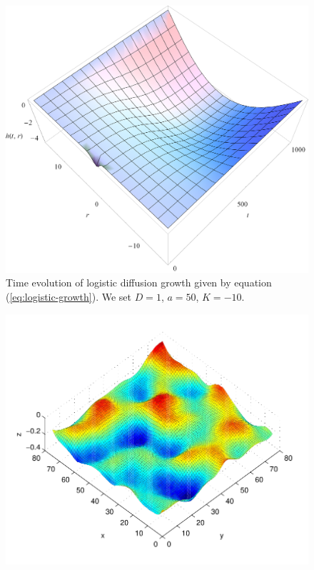 \documentclass[a0,portrait]{a0poster}
\begin{document}
\begin{multicols}{2}
  \begin{minipage}[b]{0.5\textwidth}
  \centering
      \begin{minipage}{0.43\linewidth}
          \begin{figure}[H]
              \includegraphics[width=\textwidth]{difuzija-logisticna-rast2.png}
              \caption{Time evolution of logistic diffusion growth given by equation (\ref{eq:logistic-growth}). We set $D = 1$, $a = 50$, $K = -10$.}
              \label{fig:logistic-growth}
          \end{figure}
      \end{minipage}
      \hspace{0.05\linewidth}
      \begin{minipage}{0.5\linewidth}
          \begin{figure}[H]
              \includegraphics[width=\textwidth]{KPZ-numericno.pdf}

\end{figure}
\end{minipage}
\end{minipage}
\end{multicols}
\end{document}
